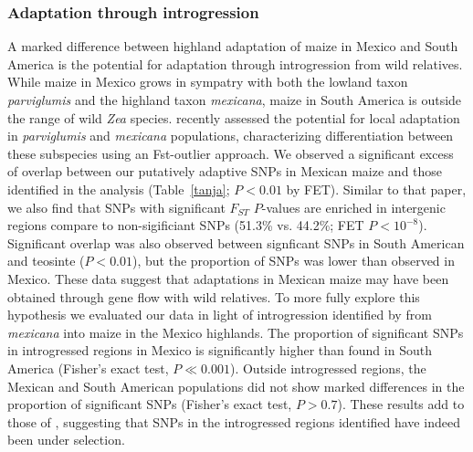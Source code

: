 {{%

\subsubsection{Adaptation through introgression}

A marked difference between highland adaptation of maize in Mexico and South America is the potential for adaptation through introgression from wild relatives.  While maize in Mexico grows in sympatry with both the lowland taxon \emph{parviglumis} and the highland taxon \emph{mexicana}, maize in South America is outside the range of wild \emph{Zea} species.
 \cite{Pyhajarvi2013} recently assessed the potential for local adaptation in \emph{parviglumis} and \emph{mexicana} populations, characterizing differentiation between these subspecies using an Fst-outlier approach.
We observed a significant excess of overlap between our putatively adaptive SNPs in Mexican maize and those identified in the \cite{Pyhajarvi2013} analysis (Table~\ref{tanja}; $P<0.01$ by FET). Similar to that paper, we also find that SNPs with significant $F_{ST}$ $P$-values are enriched in intergenic regions compare to non-sigificiant SNPs (51.3\% vs. 44.2\%; FET $P < 10^{-8}$). Significant overlap was also observed between signficant SNPs in South American and teosinte ($P<0.01$), but the proportion of SNPs was lower than observed in Mexico.  These data suggest that adaptations in Mexican maize may have been obtained through gene flow with wild relatives.  To more fully explore this hypothesis we evaluated our data in light of introgression identified by \cite{Profford_2013} from \emph{mexicana} into maize in the Mexico highlands.  
The proportion of significant SNPs in introgressed regions in Mexico is significantly higher than found in South America (Fisher's exact test, $P\ll0.001$).
Outside introgressed regions, the Mexican and South American populations did not show marked differences in the proportion of significant SNPs (Fisher's exact test, $P>0.7$). These results add to those of \cite{Profford_2013}, suggesting that SNPs in the introgressed regions identified have indeed been under selection.  

}}

